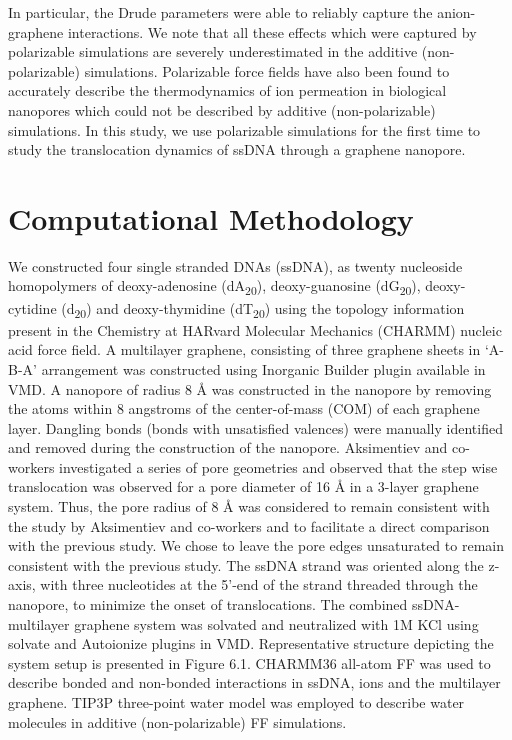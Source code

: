 In particular, the Drude parameters were able to reliably capture the anion-graphene interactions. We note that all these effects which were captured by polarizable simulations are severely underestimated in the additive (non-polarizable) simulations.\supercite{h_polarization_2021,h_capturing_2022,h_capturing_2023} Polarizable force fields have also been found to accurately describe the thermodynamics of ion permeation in biological nanopores which could not be described by additive (non-polarizable) simulations.\supercite{prajapati_computational_2020} In this study, we use polarizable simulations for the first time to study the translocation dynamics of ssDNA through a graphene nanopore. 

\section{Computational Methodology}
We constructed four single stranded DNAs (ssDNA), as twenty nucleoside homopolymers of deoxy-adenosine (dA\textsubscript{20}), deoxy-guanosine (dG\textsubscript{20}), deoxy-cytidine (d\textsubscript{20}) and deoxy-thymidine (dT\textsubscript{20}) using the topology information present in the Chemistry at HARvard Molecular Mechanics (CHARMM) nucleic acid force field.\supercite{hart_optimization_2012,foloppe_all-atom_2000,mackerell_all-atom_2000} A multilayer graphene, consisting of three graphene sheets in ‘A-B-A’ arrangement was constructed using Inorganic Builder plugin available in VMD.\supercite{humphrey_vmd_1996} A nanopore of radius 8 Å was constructed in the nanopore by removing the atoms within 8 angstroms of the center-of-mass (COM) of each graphene layer. Dangling bonds (bonds with unsatisfied valences) were manually identified and removed during the construction of the nanopore. Aksimentiev and co-workers investigated a series of pore geometries and observed that the step wise translocation was observed for a pore diameter of 16 Å in a 3-layer graphene system.\supercite{wells_assessing_2012} Thus, the pore radius of 8 Å was considered to remain consistent with the study by Aksimentiev and co-workers and to facilitate a direct comparison with the previous study.\supercite{wells_assessing_2012} We chose to leave the pore edges unsaturated to remain consistent with the previous study.\supercite{wells_assessing_2012} The ssDNA strand was oriented along the z-axis, with three nucleotides at the 5’-end of the strand threaded through the nanopore, to minimize the onset of translocations. The combined ssDNA-multilayer graphene system was solvated and neutralized with 1M KCl using solvate and Autoionize plugins in VMD. Representative structure depicting the system setup is presented in Figure 6.1. CHARMM36 all-atom FF was used to describe bonded and non-bonded interactions in ssDNA,\supercite{hart_optimization_2012,foloppe_all-atom_2000,mackerell_all-atom_2000} ions\supercite{beglov_finite_1994} and the multilayer graphene.\supercite{vanommeslaeghe_charmm_2009} TIP3P three-point water model\supercite{jorgensen_comparison_1983} was employed to describe water molecules in additive (non-polarizable) FF simulations. 
